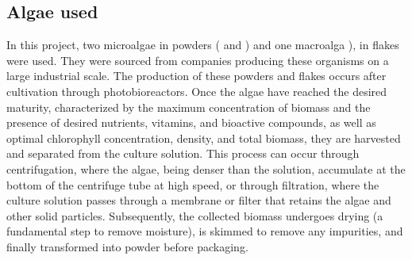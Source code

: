 \subsection{Algae used}
In this project, two microalgae in powders ( and ) and one macroalga ), in flakes were used. They were sourced from companies producing these organisms on a large industrial scale. The production of these powders and flakes occurs after cultivation through photobioreactors. Once the algae have reached the desired maturity, characterized by the maximum concentration of biomass and the presence of desired nutrients, vitamins, and bioactive compounds, as well as optimal chlorophyll concentration, density, and total biomass, they are harvested and separated from the culture solution. This process can occur through centrifugation, where the algae, being denser than the solution, accumulate at the bottom of the centrifuge tube at high speed, or through filtration, where the culture solution passes through a membrane or filter that retains the algae and other solid particles. Subsequently, the collected biomass undergoes drying (a fundamental step to remove moisture), is skimmed to remove any impurities, and finally transformed into powder before packaging.


